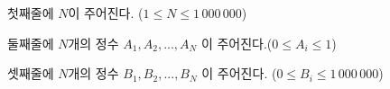첫째줄에 $N$이 주어진다. ($1 \le N \le 1\,000\,000$)

둘째줄에 $N$개의 정수 $A_1, A_2, ..., A_N$ 이 주어진다.($0 \le A_i \le 1$)

셋째줄에 $N$개의 정수 $B_1, B_2, ..., B_N$ 이 주어진다. ($0 \le B_i \le 1\,000\,000$)

